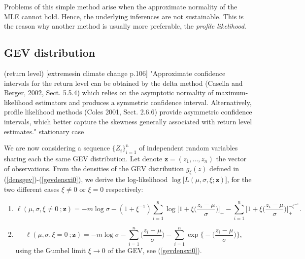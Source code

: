 \documentclass[11pt,a4paper,openany ]{book}
\begin{document}
Problems of this simple method arise when the approximate normality of the MLE cannot hold. Hence, the underlying inferences are not sustainable. This is the reason why another method is usually more preferable, the \emph{profile likelihood}.



\subsection*{GEV distribution}

(return level) [extremesin climate change p.106] "Approximate confidence intervals for the return level can be obtained by the
delta method (Casella and Berger, 2002, Sect. 5.5.4) which relies on the asymptotic
normality of maximum-likelihood estimators and produces a symmetric confidence
interval. Alternatively, profile likelihood methods (Coles 2001, Sect. 2.6.6) provide
asymmetric confidence intervals, which better capture the skewness generally
associated with return level estimates." stationary case

We are now considering a sequence $\{Z_i\}_{i=1}^n$ of independent random variables sharing 
each the same GEV distribution. Let denote $\boldsymbol{z}=(z_1,\dots,z_n)$ the vector of 
observations.
From the densities of the GEV distribution $g_{\xi}(z)$ defined in 
(\ref{densgev})-(\ref{gevdensxi0}), we derive the log-likelihood 
$\log\big[L(\mu,\sigma,\xi;\boldsymbol{z})\big]$, for the two different cases $\xi\neq 0$ 
or $\xi=0$ respectively:


\begin{enumerate}
	\item \begin{equation} \label{llik12}
	\ell(\mu,\sigma,\xi\neq 0\ ;\textbf{z})= 
	-m\log\sigma-(1+\xi^{-1})\sum_{i=1}^n\log\bigg[1+\xi\bigg(\frac{z_i-\mu}{\sigma}\bigg)\bigg]_+-\sum_{i=1}^n\bigg[1+\xi\bigg(\frac{z_i-\mu}{\sigma}\bigg)\bigg]_+^{-\xi^{-1}}.
	\end{equation}
	
	
	
	\item \begin{equation} \label{llik0}
	\ell(\mu,\sigma,\xi=0\ ;\textbf{z})=-m\log 
	\sigma-\sum_{i=1}^n\bigg(\frac{z_i-\mu}{\sigma}\bigg)-\sum_{i=1}^{n}\exp\bigg\{-\bigg(\frac{z_i-\mu}{\sigma}\bigg)\bigg\},
	\end{equation}
	using the Gumbel limit $\xi\rightarrow 0$ of the GEV, see (\ref{gevdensxi0}).
\end{enumerate}
\end{document}
